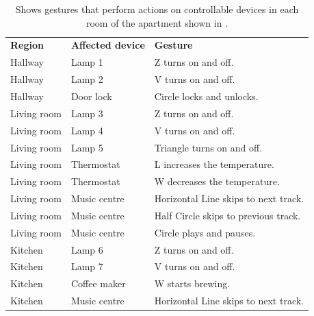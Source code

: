 \begin{table}[]
\centering
\caption{Shows gestures that perform actions on controllable devices in each room of the apartment shown in .}
\label{tbl:analysis:scenario:gesture-configurations}
\begin{tabular}{lll}
\textbf{Region} & \textbf{Affected device} & \textbf{Gesture}                       \\
Hallway                    & Lamp 1                              & Z turns on and off.                      \\
Hallway                    & Lamp 2                              & V turns on and off.                      \\
Hallway                    & Door lock                           & Circle locks and unlocks.                \\
Living room                & Lamp 3                              & Z turns on and off.                      \\
Living room                & Lamp 4                              & V turns on and off.                      \\
Living room                & Lamp 5                              & Triangle turns on and off.               \\
Living room                & Thermostat                          & L increases the temperature.             \\
Living room                & Thermostat                          & W decreases the temperature.             \\
Living room                & Music centre                        & Horizontal Line skips to next track.     \\
Living room                & Music centre                        & Half Circle skips to previous track.     \\
Living room                & Music centre                        & Circle plays and pauses.                 \\
Kitchen                    & Lamp 6                              & Z turns on and off.                      \\
Kitchen                    & Lamp 7                              & V turns on and off.                      \\
Kitchen                    & Coffee maker                        & W starts brewing.                        \\
Kitchen                    & Music centre                        & Horizontal Line skips to next track.     \\

\end{tabular}
\end{table}

